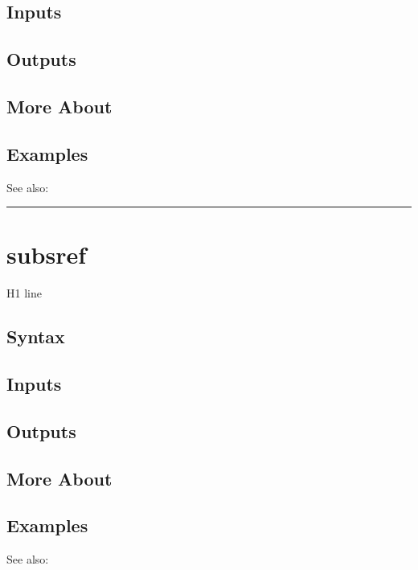 \documentclass[letterpaper,10pt,english]{sphinxmanual}
\begin{document}
\subsection{Inputs}
\label{classes/time_series/@ts/ts:id550}

\subsection{Outputs}
\label{classes/time_series/@ts/ts:id551}

\subsection{More About}
\label{classes/time_series/@ts/ts:id552}

\subsection{Examples}
\label{classes/time_series/@ts/ts:id553}
See also:


\bigskip\hrule{}\bigskip



\section{subsref}
\label{classes/time_series/@ts/ts:subsref}\label{classes/time_series/@ts/ts:id554}
H1 line


\subsection{Syntax}
\label{classes/time_series/@ts/ts:id555}

\subsection{Inputs}
\label{classes/time_series/@ts/ts:id556}

\subsection{Outputs}
\label{classes/time_series/@ts/ts:id557}

\subsection{More About}
\label{classes/time_series/@ts/ts:id558}

\subsection{Examples}
\label{classes/time_series/@ts/ts:id559}
See also:
\end{document}
